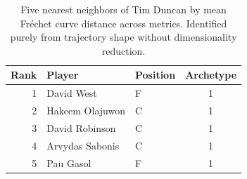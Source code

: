 \begin{table}[htbp]
  \centering\small
  \begin{tabular}{rllc}
    \toprule
    Rank & Player & Position & Archetype \\
    \midrule
    1 & David West & F & 1 \\
    2 & Hakeem Olajuwon & C & 1 \\
    3 & David Robinson & C & 1 \\
    4 & Arvydas Sabonis & C & 1 \\
    5 & Pau Gasol & F & 1 \\
    \bottomrule
  \end{tabular}
  \caption{Five nearest neighbors of Tim Duncan by mean Fr\'{e}chet curve distance across metrics. Identified purely from trajectory shape without dimensionality reduction.}
  \label{tab:Tim_Duncan_frechet_curve_neighbors}
\end{table}

